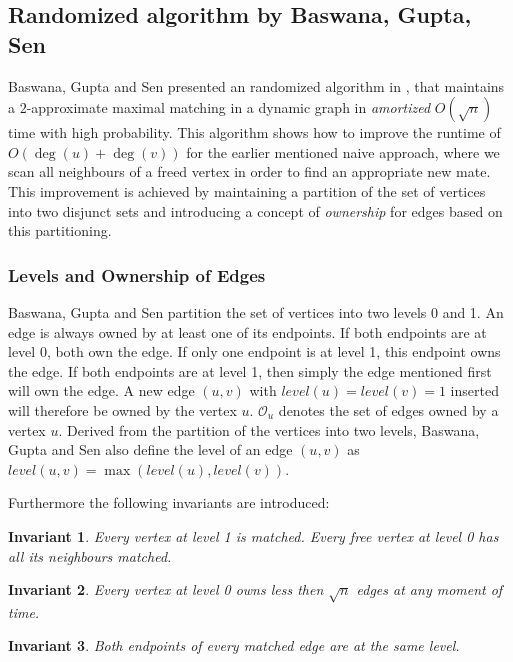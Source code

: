 \documentclass{article}      %
\newtheorem{invariant}{Invariant}%
\begin{document}
\subsection{Randomized algorithm by Baswana, Gupta, Sen}
\label{sec:bgs}

Baswana, Gupta and Sen presented an randomized algorithm in \cite{bgs}, that maintains a $2$-approximate maximal matching in a dynamic graph in \emph{amortized} $O(\sqrt{n})$ time with high probability. This algorithm shows how to improve the runtime of $O(\deg(u)+\deg(v))$ for the earlier mentioned naive approach, where we scan all neighbours of a freed vertex in order to find an appropriate new mate. This improvement is achieved by maintaining a partition of the set of vertices into two disjunct sets and introducing a concept of \emph{ownership} for edges based on this partitioning. 

\subsubsection{Levels and Ownership of Edges}
\label{sec:own-edge}

Baswana, Gupta and Sen partition the set of vertices into two levels 0 and 1. An edge is always owned by at least one of its endpoints. If both endpoints are at level 0, both own the edge. If only one endpoint is at level 1, this endpoint owns the edge. If both endpoints are at level 1, then simply the edge mentioned first will own the edge. A new edge $(u,v)$ with $\mathit{level}(u) = \mathit{level}(v) = 1$ inserted will therefore be owned by the vertex $u$. $\mathcal{O}_u$ denotes the set of edges owned by a vertex $u$. Derived from the partition of the vertices into two levels, Baswana, Gupta and Sen also define the level of an edge $(u,v)$ as $\mathit{level}(u,v)=\max(\mathit{level}(u),\mathit{level}(v))$.

Furthermore the following invariants are introduced:

\begin{invariant}
\label{inv:bgs-1}
Every vertex at level 1 is matched. Every free vertex at level 0 has all its neighbours matched.
\end{invariant}

\begin{invariant}
\label{inv:bgs-2}
Every vertex at level 0 owns less then $\sqrt{n}$ edges at any moment of time.
\end{invariant}

\begin{invariant}
\label{inv:bgs-3}
Both endpoints of every matched edge are at the same level.
\end{invariant}
\end{document}
